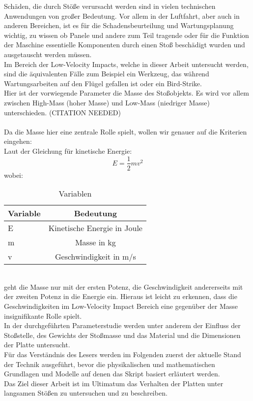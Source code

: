 Schäden, die durch Stöße verursacht werden sind in vielen technischen Anwendungen von großer Bedeutung. Vor allem in der Luftfahrt, aber auch in anderen Bereichen, ist es für die Schadensbeurteilung und Wartungsplanung wichtig, zu wissen ob Panele und andere zum Teil tragende oder für die Funktion der Maschine essentielle Komponenten durch einen Stoß beschädigt wurden und ausgetauscht werden müssen. \\
Im Bereich der Low-Velocity Impacts, welche in dieser Arbeit untersucht werden, sind die äquivalenten Fälle zum Beispiel ein Werkzeug, das während Wartungsarbeiten auf den Flügel gefallen ist oder ein Bird-Strike. \\
Hier ist der vorwiegende Parameter die Masse des Stoßobjekts. Es wird vor allem zwischen High-Mass (hoher Masse) und Low-Mass (niedriger Masse) unterschieden. (CITATION NEEDED)\\
\\
Da die Masse hier eine zentrale Rolle spielt, wollen wir genauer auf die Kriterien eingehen: \\
Laut der Gleichung für kinetische Energie: 
\begin{equation}
E = \frac{1}{2}mv^2
\end{equation}
wobei: 
\begin{table}[h!]
	\begin{center}
		\caption{Variablen}
		\label{tab:Tabelle 1}
		\begin{tabular}{l|c}
			\textbf{Variable} & \textbf{Bedeutung}\\
			\hline
			E & Kinetische Energie in Joule\\
			m & Masse in kg\\
			v & Geschwindigkeit in m/s\\
		\end{tabular}
	\end{center}
\end{table}\\
geht die Masse nur mit der ersten Potenz, die Geschwindigkeit andererseits mit der zweiten Potenz in die Energie ein. Hieraus ist leicht zu erkennen, dass die Geschwindigkeiten im Low-Velocity Impact Bereich eine gegenüber der Masse insignifikante Rolle spielt. \\
In der durchgeführten Parameterstudie werden unter anderem der Einfluss der Stoßstelle, des Gewichts der Stoßmasse und das Material und die Dimensionen der Platte untersucht. \\
Für das Verständnis des Lesers werden im Folgenden zuerst der aktuelle Stand der Technik ausgeführt, bevor die physikalischen und mathematischen Grundlagen und Modelle auf denen das Skript basiert erläutert werden.\\

Das Ziel dieser Arbeit ist im Ultimatum das Verhalten der Platten unter langsamen Stößen zu untersuchen und zu beschreiben. 
 